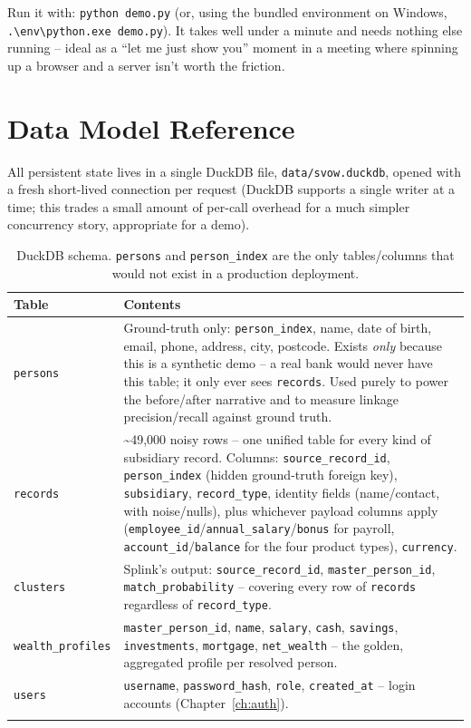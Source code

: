 \documentclass[11pt]{report}
\newcommand{\code}[1]{\lstinline[style=plain]!#1!}
\begin{document}
\begin{bizbox}
Run it with: \code{python demo.py} (or, using the bundled environment on Windows, \texttt{.\textbackslash{}env\textbackslash{}python.exe demo.py}). It takes well under a minute and needs nothing else running -- ideal as a ``let me just show you'' moment in a meeting where spinning up a browser and a server isn't worth the friction.
\end{bizbox}

\chapter{Data Model Reference}
\label{ch:datamodel}

All persistent state lives in a single DuckDB file, \texttt{data/svow.duckdb}, opened with a fresh short-lived connection per request (DuckDB supports a single writer at a time; this trades a small amount of per-call overhead for a much simpler concurrency story, appropriate for a demo).

\begin{longtable}{@{}p{3.1cm}p{9.2cm}@{}}
\toprule
\textbf{Table} & \textbf{Contents} \\
\midrule
\endhead
\texttt{persons} & Ground-truth only: \texttt{person\_index}, name, date of birth, email, phone, address, city, postcode. Exists \emph{only} because this is a synthetic demo -- a real bank would never have this table; it only ever sees \texttt{records}. Used purely to power the before/after narrative and to measure linkage precision/recall against ground truth. \\
\texttt{records} & \textasciitilde49,000 noisy rows -- one unified table for every kind of subsidiary record. Columns: \texttt{source\_record\_id}, \texttt{person\_index} (hidden ground-truth foreign key), \texttt{subsidiary}, \texttt{record\_type}, identity fields (name/contact, with noise/nulls), plus whichever payload columns apply (\texttt{employee\_id}/\texttt{annual\_salary}/\texttt{bonus} for payroll, \texttt{account\_id}/\texttt{balance} for the four product types), \texttt{currency}. \\
\texttt{clusters} & Splink's output: \texttt{source\_record\_id}, \texttt{master\_person\_id}, \texttt{match\_probability} -- covering every row of \texttt{records} regardless of \texttt{record\_type}. \\
\texttt{wealth\_profiles} & \texttt{master\_person\_id}, \texttt{name}, \texttt{salary}, \texttt{cash}, \texttt{savings}, \texttt{investments}, \texttt{mortgage}, \texttt{net\_wealth} -- the golden, aggregated profile per resolved person. \\
\texttt{users} & \texttt{username}, \texttt{password\_hash}, \texttt{role}, \texttt{created\_at} -- login accounts (Chapter~\ref{ch:auth}). \\
\bottomrule
\caption{DuckDB schema. \texttt{persons} and \texttt{person\_index} are the only tables/columns that would not exist in a production deployment.}
\end{longtable}
\end{document}

